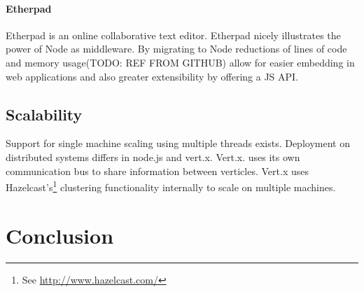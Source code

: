 \paragraph{Etherpad}
Etherpad is an online collaborative text editor. Etherpad nicely illustrates the power of Node as middleware. By migrating to Node reductions of lines of code and memory usage(TODO: REF FROM GITHUB) allow for easier embedding in web applications and also greater extensibility by offering a JS API.




\subsection{Scalability}
\label{scalability}
Support for single machine scaling using multiple threads exists.
Deployment on distributed systems differs in node.js and vert.x.
Vert.x. uses its own communication bus to share information between verticles.
Vert.x uses Hazelcast's\footnote{See \url{http://www.hazelcast.com/}} clustering functionality internally to scale on multiple machines. 


\section{Conclusion}
\label{conclusion}


